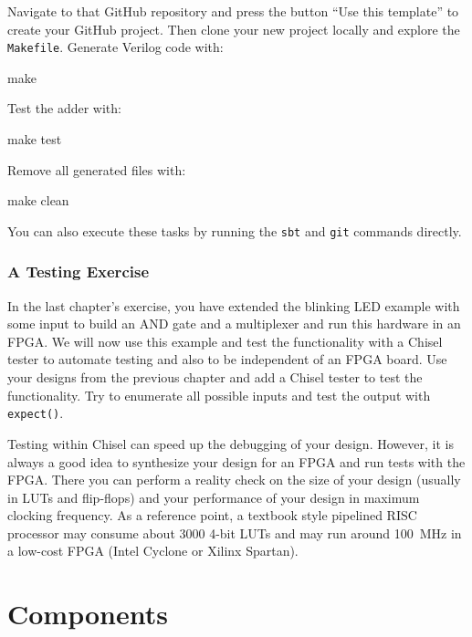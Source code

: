\documentclass[%
    10pt,
    headinclude, footexclude,
    openright, %
    notitlepage,
    cleardoubleempty,
    headsepline,
    pointlessnumbers,
    bibtotoc, idxtotoc,
    ]{scrbook}
\newcommand{\code}[1]{{\small{\texttt{#1}}}}
\begin{document}
Navigate to that GitHub repository and press the button ``Use this template'' to create
your GitHub project. Then clone your new project locally and explore the \code{Makefile}.
Generate Verilog code with:

\begin{chisel}
make
\end{chisel}

\noindent Test the adder with:

\begin{chisel}
make test
\end{chisel}

\noindent Remove all generated files with:

\begin{chisel}
make clean
\end{chisel}

\noindent You can also execute these tasks by running the \code{sbt} and \code{git} commands directly.

\subsection{A Testing Exercise}

In the last chapter's exercise, you have extended the blinking LED example with some input
to build an AND gate and a multiplexer and run this hardware in an FPGA.
We will now use this example and test the functionality with a Chisel tester
to automate testing and also to be independent of an FPGA board.
Use your designs from the previous chapter and add a Chisel tester to test the functionality.
Try to enumerate all possible inputs and test the output with \code{expect()}.

Testing within Chisel can speed up the debugging of your design.
However, it is always a good idea to synthesize your design for an FPGA and run tests
with the FPGA. There you can perform a reality check on the size of your design (usually
in LUTs and flip-flops) and your performance of your design in maximum clocking frequency.
As a reference point, a textbook style pipelined RISC processor may consume about 3000
4-bit LUTs and may run around 100~MHz in a low-cost FPGA (Intel Cyclone or
Xilinx Spartan).


\chapter{Components}

\end{document}
